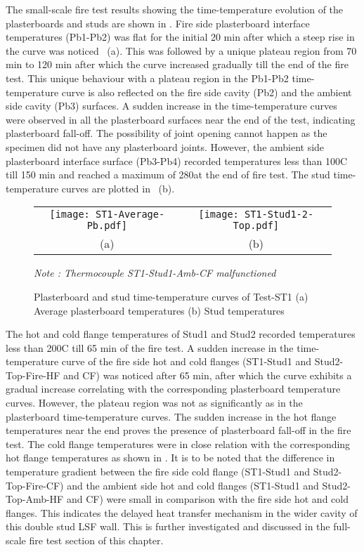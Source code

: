 The small-scale fire test results showing the time-temperature evolution of the plasterboards and studs are shown in . Fire side plasterboard interface temperatures (Pb1-Pb2) was flat for the initial 20 min after which a steep rise in the curve was noticed ~(a). This was followed by a unique plateau region from 70 min to 120 min after which the curve increased gradually till the end of the fire test. This unique behaviour with a plateau region in the Pb1-Pb2 time-temperature curve is also reflected on the fire side cavity (Pb2) and the ambient side cavity (Pb3) surfaces. A sudden increase in the time-temperature curves were observed in all the plasterboard surfaces near the end of the test, indicating plasterboard fall-off. The possibility of joint opening cannot happen as the specimen did not have any plasterboard joints. However, the ambient side plasterboard interface surface (Pb3-Pb4) recorded temperatures less than 100\degree C till 150 min and reached a maximum of 280\degree at the end of fire test. The stud time-temperature curves are plotted in ~(b).  
\begin{figure}[htbp]
	\centering
		\begin{tabular}{cc}
			\texttt{[image: ST1-Average-Pb.pdf]} & \texttt{[image: ST1-Stud1-2-Top.pdf]} \\ 
			(a) & (b)  \\ 
		\end{tabular} 
		\caption{Plasterboard and stud time-temperature curves of Test-ST1 (a) Average plasterboard temperatures (b) Stud temperatures}
		\fontsize{10}{1}\textit{Note : Thermocouple ST1-Stud1-Amb-CF malfunctioned}
		\label{fig:ST1-PB&Stud}
\end{figure}

The hot and cold flange temperatures of Stud1 and Stud2 recorded temperatures less than 200\degree C till 65 min of the fire test. A sudden increase in the time-temperature curve of the fire side hot and cold flanges (ST1-Stud1 and Stud2-Top-Fire-HF and CF) was noticed after 65 min, after which the curve exhibits a gradual increase correlating with the corresponding plasterboard temperature curves. However, the plateau region was not as significantly as in the plasterboard time-temperature curves. The sudden increase in the hot flange temperatures near the end proves the presence of plasterboard fall-off in the fire test. The cold flange temperatures were in close relation with the corresponding hot flange temperatures as shown in . It is to be noted that the difference in temperature gradient between the fire side cold flange (ST1-Stud1 and Stud2-Top-Fire-CF) and the ambient side hot and cold flanges (ST1-Stud1 and Stud2-Top-Amb-HF and CF) were small in comparison with the fire side hot and cold flanges. This indicates the delayed heat transfer mechanism in the wider cavity of this double stud LSF wall. This is further investigated and discussed in the full-scale fire test section of this chapter.

